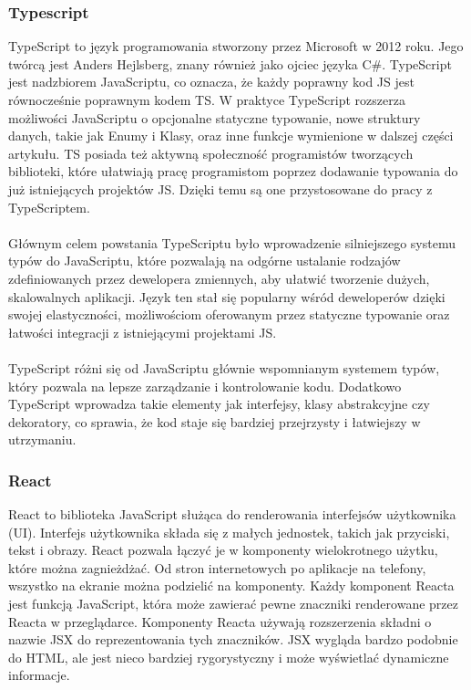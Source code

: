 \documentclass[12pt,a4paper]{article}
\begin{document}
\subsubsection{Typescript}
TypeScript to język programowania stworzony przez Microsoft w 2012 roku. Jego twórcą jest Anders Hejlsberg, znany również jako ojciec języka C\#. TypeScript jest nadzbiorem JavaScriptu, co oznacza, że każdy poprawny kod JS jest równocześnie poprawnym kodem TS. W praktyce TypeScript rozszerza możliwości JavaScriptu o opcjonalne statyczne typowanie, nowe struktury danych, takie jak Enumy i Klasy, oraz inne funkcje wymienione w dalszej części artykułu. TS posiada też aktywną społeczność programistów tworzących biblioteki, które ułatwiają pracę programistom poprzez dodawanie typowania do już istniejących projektów JS. Dzięki temu są one przystosowane do pracy z TypeScriptem.
\\\\
Głównym celem powstania TypeScriptu było wprowadzenie silniejszego systemu typów do JavaScriptu, które pozwalają na odgórne ustalanie rodzajów zdefiniowanych przez dewelopera zmiennych, aby ułatwić tworzenie dużych, skalowalnych aplikacji. Język ten stał się popularny wśród deweloperów dzięki swojej elastyczności, możliwościom oferowanym przez statyczne typowanie oraz łatwości integracji z istniejącymi projektami JS.
\\\\
TypeScript różni się od JavaScriptu głównie wspomnianym systemem typów, który pozwala na lepsze zarządzanie i kontrolowanie kodu. Dodatkowo TypeScript wprowadza takie elementy jak interfejsy, klasy abstrakcyjne czy dekoratory, co sprawia, że kod staje się bardziej przejrzysty i łatwiejszy w utrzymaniu.

\subsubsection{React}
React to biblioteka JavaScript służąca do renderowania interfejsów użytkownika (UI). Interfejs użytkownika składa się z małych jednostek, takich jak przyciski, tekst i obrazy. React pozwala łączyć je w komponenty wielokrotnego użytku, które można zagnieżdżać. Od stron internetowych po aplikacje na telefony, wszystko na ekranie można podzielić na komponenty. Każdy komponent Reacta jest funkcją JavaScript, która może zawierać pewne znaczniki renderowane przez Reacta w przeglądarce. Komponenty Reacta używają rozszerzenia składni o nazwie JSX do reprezentowania tych znaczników. JSX wygląda bardzo podobnie do HTML, ale jest nieco bardziej rygorystyczny i może wyświetlać dynamiczne informacje. 
\end{document}

